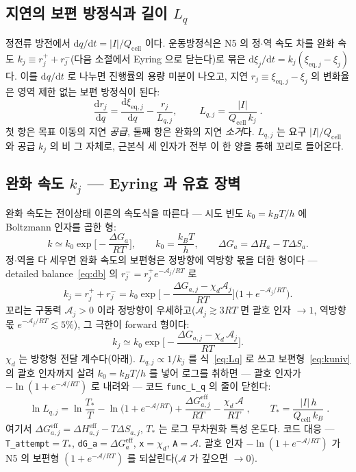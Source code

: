 \documentclass[11pt,a4paper]{article}
\newcommand{\dd}{\mathrm{d}}
\newcommand{\eff}{\mathrm{eff}}
\newcommand{\eq}{\mathrm{eq}}
\newcommand{\cell}{\mathrm{cell}}
\newcommand{\code}[1]{\texttt{#1}}
\begin{document}
\subsection{지연의 보편 방정식과 길이 $L_q$}
정전류 방전에서 $\dd q/\dd t=|I|/Q_\cell$ 이다. 운동방정식은 N5 의 정$\cdot$역 속도 차를 완화 속도 $k_j\equiv r_j^++r_j^-$(다음 소절에서 Eyring 으로 닫는다)로 묶은 $\dd\xi_j/\dd t=k_j(\xi_{\eq,j}-\xi_j)$ 다. 이를 $\dd q/\dd t$ 로 나누면 진행률의 용량 미분이 나오고, 지연 $r_j\equiv\xi_{\eq,j}-\xi_j$ 의 변화율은 영역 제한 없는 보편 방정식이 된다:
\begin{equation}
\frac{\dd r_j}{\dd q}=\frac{\dd\xi_{\eq,j}}{\dd q}-\frac{r_j}{L_{q,j}},\qquad
\boxed{\;L_{q,j}=\frac{|I|}{Q_\cell\,k_j}\;.}
\label{eq:Lq}
\end{equation}
첫 항은 목표 이동의 지연 \emph{공급}, 둘째 항은 완화의 지연 \emph{소거}다. $L_{q,j}$ 는 요구 $|I|/Q_\cell$ 와 공급 $k_j$ 의 비 그 자체로, 근본식 세 인자가 전부 이 한 양을 통해 꼬리로 들어온다.

\subsection{완화 속도 $k_j$ — Eyring 과 유효 장벽}
완화 속도는 전이상태 이론의 속도식을 따른다 \cite{eyring1935} — 시도 빈도 $k_0=k_BT/h$ 에 Boltzmann 인자를 곱한 형:
\begin{equation}
k\simeq k_0\exp\!\Big[-\frac{\Delta G_a}{RT}\Big],\qquad k_0=\frac{k_BT}{h},\qquad \Delta G_a=\Delta H_a-T\Delta S_a.
\label{eq:eyring}
\end{equation}
정$\cdot$역을 다 세우면 완화 속도의 보편형은 정방향에 역방향 몫을 더한 형이다 — detailed balance~\eqref{eq:db} 의 $r_j^-=r_j^+e^{-\mathcal A_j/RT}$ 로
\begin{equation}
k_j=r_j^++r_j^-=k_0\exp\!\Big[-\frac{\Delta G_{a,j}-\chi_d\mathcal A_j}{RT}\Big]\big(1+e^{-\mathcal A_j/RT}\big).
\label{eq:kuniv}
\end{equation}
꼬리는 구동력 $\mathcal A_j>0$ 이라 정방향이 우세하고($\mathcal A_j\gtrsim3RT$ 면 괄호 인자 $\to1$, 역방향 몫 $e^{-\mathcal A_j/RT}\lesssim5\%$), 그 극한이 forward 형이다:
\begin{equation}
k_j\simeq k_0\exp\!\Big[-\frac{\Delta G_{a,j}-\chi_d\,\mathcal A_j}{RT}\Big].
\label{eq:keff}
\end{equation}
$\chi_d$ 는 방향형 전달 계수다(아래). $L_{q,j}\propto1/k_j$ 를 식~\eqref{eq:Lq} 로 쓰고 보편형~\eqref{eq:kuniv} 의 괄호 인자까지 살려 $k_0=k_BT/h$ 를 넣어 로그를 취하면 — 괄호 인자가 $-\ln(1+e^{-\mathcal A/RT})$ 로 내려와 — 코드 \code{func\_L\_q} 의 줄이 닫힌다:
\begin{equation}
\boxed{\;\ln L_{q,j}=\ln\frac{T_*}{T}-\ln\!\big(1+e^{-\mathcal A/RT}\big)+\frac{\Delta G_{a,j}^\eff}{RT}-\frac{\chi_d\,\mathcal A}{RT}\;,\qquad
T_*=\frac{|I|\,h}{Q_\cell\,k_B}\;.}
\label{eq:lnLq}
\end{equation}
여기서 $\Delta G_{a,j}^\eff=\Delta H_{a,j}^\eff-T\Delta S_{a,j}$, $T_*$ 는 로그 무차원화 특성 온도다. 코드 대응 — \code{T\_attempt}$=T_*$, \code{dG\_a}$=\Delta G_a^\eff$, \code{x}$=\chi_d$, \code{A}$=\mathcal A$. 괄호 인자 $-\ln(1+e^{-\mathcal A/RT})$ 가 N5 의 보편형 $(1+e^{-\mathcal A/RT})$ 를 되살린다($\mathcal A$ 가 깊으면 $\to0$).
\end{document}
